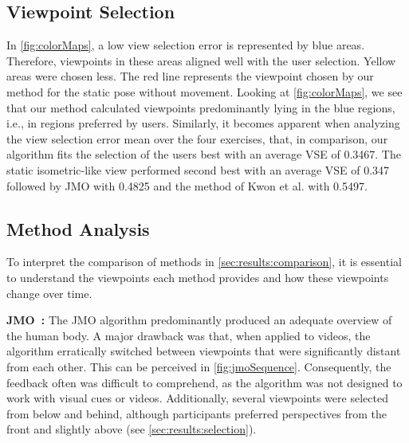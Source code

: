 \subsection{Viewpoint Selection \label{sec:results:selection}}
In \autoref{fig:colorMaps}, a low view selection error is represented by blue areas. Therefore, viewpoints in these areas aligned well with the user selection. Yellow areas were chosen less. The red line represents the viewpoint chosen by our method for the static pose without movement. Looking at \autoref{fig:colorMaps}, we see that our method calculated viewpoints predominantly lying in the blue regions, i.e., in regions preferred by users. Similarly, it becomes apparent when analyzing the view selection error mean over the four exercises, that, in comparison, our algorithm fits the selection of the users best with an average VSE of 0.3467. The static isometric-like view performed second best with an average VSE of 0.347 followed by JMO with 0.4825 and the method of Kwon et al. with 0.5497.

\subsection{Method Analysis\label{sec:results:analysis}}
To interpret the comparison of methods in \autoref{sec:results:comparison}, it is essential to understand the viewpoints each method provides and how these viewpoints change over time.

\textbf{JMO~\cite{ishara2015mra}:}
The JMO algorithm predominantly produced an adequate overview of the human body. A major drawback was that, when applied to videos, the algorithm erratically switched between viewpoints that were significantly distant from each other. This can be perceived in \autoref{fig:jmoSequence}. Consequently, the feedback often was difficult to comprehend, as the algorithm was not designed to work with visual cues or videos. Additionally, several viewpoints were selected from below and behind, although participants preferred perspectives from the front and slightly above (see \autoref{sec:results:selection}).

